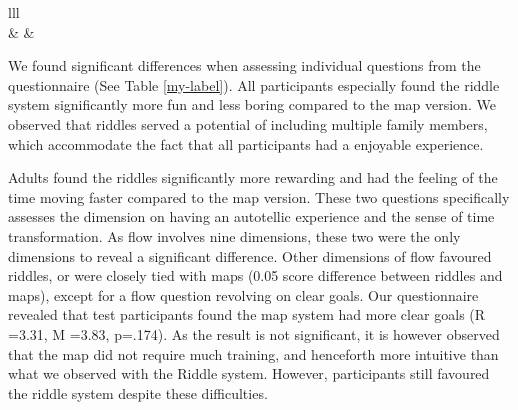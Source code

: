 \begin{table}[h]
\begin{tabular}{lll}
                                                                                                                                                                                                                                         \\ \hline
{}                                                                   &                   &                     \\ \hline
{}                                                                                                                                      
\end{tabular}
\end{table}

We found significant differences when assessing individual questions from the questionnaire (See Table \ref{my-label}). All participants especially found the riddle system significantly more fun and less boring compared to the map version. We observed that riddles served a potential of including multiple family members, which  accommodate the fact that all participants had a enjoyable experience. 

Adults found the riddles significantly more rewarding and had the feeling of the time moving faster compared to the map version. These two questions specifically assesses the dimension on having an autotellic experience and the sense of time transformation. As flow involves nine dimensions, these two were the only dimensions to reveal a significant difference. Other dimensions of flow favoured riddles, or were closely tied with maps (0.05 score difference between riddles and maps), except for a flow question revolving on clear goals. Our questionnaire revealed that test participants found the map system had more clear goals (R =3.31, M =3.83, p=.174). As the result is not significant, it is however observed that the map did not require much training, and henceforth more intuitive than what we observed with the Riddle system. However, participants still favoured the riddle system despite these difficulties. 

